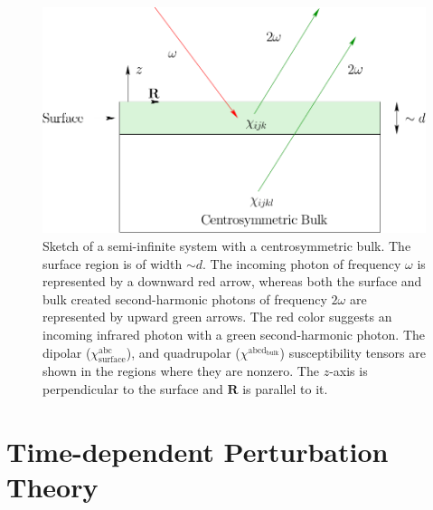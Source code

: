 \begin{figure}[t]
\centering
\includegraphics[scale=0.6]{content/figures/diag-system}
\caption{Sketch of a semi-infinite system with a centrosymmetric bulk. The
surface region is of width $\sim d$. The incoming photon of frequency $\omega$
is represented by a downward red arrow, whereas both the surface and bulk
created second-harmonic photons of frequency $2\omega$ are represented by upward
green arrows. The red color suggests an incoming infrared photon with a green
second-harmonic photon. The dipolar ($\chi^{\mathrm{abc}}_{\mathrm{surface}}$),
and quadrupolar ($\chi^{\mathrm{abcd}_{\mathrm{bulk}}}$) susceptibility tensors
are shown in the regions where they are nonzero. The $z$-axis is perpendicular
to the surface and $\mathbf{R}$ is parallel to it.}
\label{fsystem}
\end{figure}



\section{Time-dependent Perturbation Theory}\label{tdpt}

